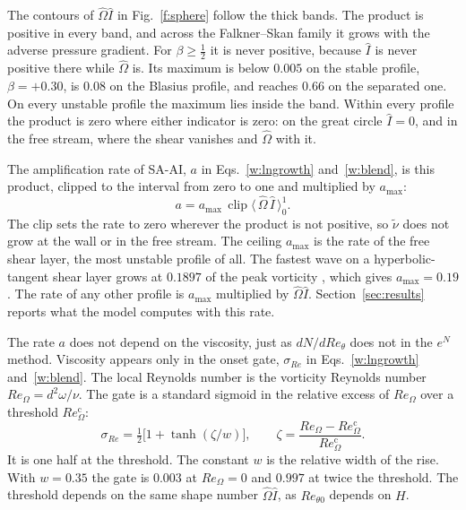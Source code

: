 \documentclass[conf]{new-aiaa}
\begin{document}
The contours of $\hat\Omega\hat I$ in Fig.~\ref{f:sphere} follow the thick
bands. The product is positive in every band, and across the Falkner--Skan
family it grows with the adverse pressure gradient. For $\beta\ge\tfrac12$ it
is never positive, because $\hat I$ is never positive there while
$\hat\Omega$ is. Its maximum is below $0.005$ on the stable profile,
$\beta=+0.30$, is $0.08$ on the Blasius profile, and reaches $0.66$ on the
separated one. On every unstable profile the maximum lies inside the band. Within every profile the product is zero where either indicator is
zero: on the great circle $\hat I=0$, and in the free stream, where the shear
vanishes and $\hat\Omega$ with it.

The amplification rate of SA-AI, $a$ in Eqs.~\eqref{w:lngrowth}
and~\eqref{w:blend}, is this product, clipped to the interval from zero to
one and multiplied by $a_{\max}$:
\begin{equation}
  a = a_{\max}\,\operatorname{clip}\!\big\langle\,\hat\Omega\,\hat I\,\big\rangle_{0}^{1} .
  \label{w:a}
\end{equation}
The clip
sets the rate to zero wherever the product is not positive, so $\tilde\nu$
does not grow at the wall or in the free stream. The ceiling $a_{\max}$ is the rate of the free shear
layer, the most unstable profile of all. The fastest wave on a
hyperbolic-tangent shear layer grows at $0.1897$ of the peak vorticity
\cite{michalke_1964}, which gives $a_{\max}=0.19$. The rate of any other
profile is $a_{\max}$ multiplied by $\hat\Omega\hat I$.
Section~\ref{sec:results} reports what the model computes with this rate.

The rate $a$ does not depend on the viscosity, just as $dN/dRe_\theta$ does
not in the $e^N$ method. Viscosity appears only in the onset gate,
$\sigma_{Re}$ in Eqs.~\eqref{w:lngrowth} and~\eqref{w:blend}. The local
Reynolds number is the vorticity Reynolds number $Re_\Omega=d^2\omega/\nu$.
The gate is a standard sigmoid in the relative excess of $Re_\Omega$ over a
threshold $Re_\Omega^{\mathrm c}$:
\begin{equation}
  \sigma_{Re} = \tfrac12\big[1+\tanh(\zeta/w)\big],
  \qquad
  \zeta = \frac{Re_\Omega-Re_\Omega^{\mathrm c}}{Re_\Omega^{\mathrm c}} .
  \label{w:rate}
\end{equation}
It is one half at the threshold. The constant $w$ is the relative width of
the rise. With $w=0.35$ the gate is $0.003$ at $Re_\Omega=0$ and $0.997$ at
twice the threshold. The threshold depends on the same shape number
$\hat\Omega\hat I$, as $Re_{\theta0}$ depends on $H$.
\end{document}
